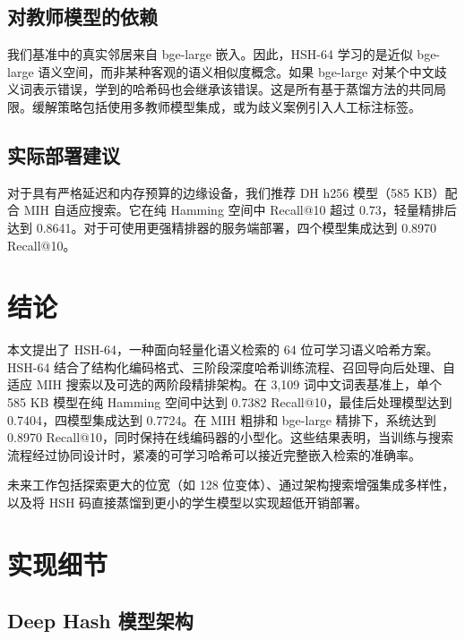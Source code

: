 \documentclass[11pt,a4paper]{article}
\begin{document}
\subsection{对教师模型的依赖}

我们基准中的真实邻居来自 bge-large 嵌入。因此，HSH-64 学习的是近似 bge-large 语义空间，而非某种客观的语义相似度概念。如果 bge-large 对某个中文歧义词表示错误，学到的哈希码也会继承该错误。这是所有基于蒸馏方法的共同局限。缓解策略包括使用多教师模型集成，或为歧义案例引入人工标注标签。

\subsection{实际部署建议}

对于具有严格延迟和内存预算的边缘设备，我们推荐 DH h256 模型（585 KB）配合 MIH 自适应搜索。它在纯 Hamming 空间中 Recall@10 超过 0.73，轻量精排后达到 0.8641。对于可使用更强精排器的服务端部署，四个模型集成达到 0.8970 Recall@10。

\section{结论}

本文提出了 HSH-64，一种面向轻量化语义检索的 64 位可学习语义哈希方案。HSH-64 结合了结构化编码格式、三阶段深度哈希训练流程、召回导向后处理、自适应 MIH 搜索以及可选的两阶段精排架构。在 3,109 词中文词表基准上，单个 585 KB 模型在纯 Hamming 空间中达到 0.7382 Recall@10，最佳后处理模型达到 0.7404，四模型集成达到 0.7724。在 MIH 粗排和 bge-large 精排下，系统达到 0.8970 Recall@10，同时保持在线编码器的小型化。这些结果表明，当训练与搜索流程经过协同设计时，紧凑的可学习哈希可以接近完整嵌入检索的准确率。

未来工作包括探索更大的位宽（如 128 位变体）、通过架构搜索增强集成多样性，以及将 HSH 码直接蒸馏到更小的学生模型以实现超低开销部署。

\printbibliography

\newpage
\appendix
\section{实现细节}

\subsection{Deep Hash 模型架构}
\end{document}
